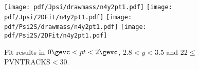 \begin{figure}[H]
\begin{center}
\texttt{[image: pdf/Jpsi/drawmass/n4y2pt1.pdf]}
\texttt{[image: pdf/Jpsi/2DFit/n4y2pt1.pdf]}
\vspace*{-0.5cm}
\texttt{[image: pdf/Psi2S/drawmass/n4y2pt1.pdf]}
\texttt{[image: pdf/Psi2S/2DFit/n4y2pt1.pdf]}
\vspace*{-0.5cm}
\end{center}
\caption{Fit results in $0\gevc<pt<2\gevc$, $2.8<y<3.5$ and 22$\leq$PVNTRACKS$<$30.}
\label{Fitn4y2pt1}
\end{figure}
